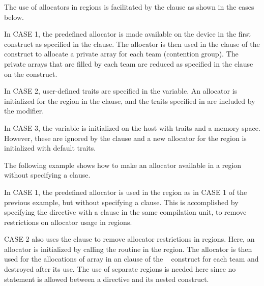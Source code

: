 \pagebreak
{}

The use of allocators in  regions is facilitated by the
 clause as shown in the cases below.

In CASE 1, the predefined  allocator is made available on the
device in the first  construct as specified in the  clause.
The allocator is then used in the 
clause of the  construct to allocate a private array for each
team (contention group). The private  arrays that are filled by each
team are reduced as specified in the  clause on the  construct.

In CASE 2, user-defined traits are specified in the  variable.
An allocator is initialized for the  region in the  clause,
and the traits specified in  are included by the  modifier.

In CASE 3, the  variable is initialized on the host with traits
and a memory space. However, these are ignored by the  clause
and a new allocator for the  region is initialized with default traits.



The following example shows how to make an allocator available in a  region 
without specifying a  clause.

In CASE 1, the predefined  allocator is used in the 
region as in CASE 1 of the previous example, but without specifying a  clause.
This is accomplished by specifying the  directive with a
 clause in the same compilation unit, to remove
restrictions on allocator usage in  regions.

CASE 2 also uses the  clause to remove allocator
restrictions in  regions. Here, an allocator is initialized
by calling the  routine in the  region.
The allocator is then used for the allocations of array  in 
an  clause of the ~ construct 
for each team and destroyed after its use.
The use of separate  regions is needed here since
no statement is allowed between a  directive and 
its nested  construct.

